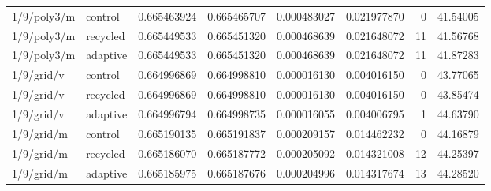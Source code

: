 \begin{longtable}{llrrrrrr}
1/9/poly3/m & control & 0.665463924 & 0.665465707 & 0.000483027 & 0.021977870 & 0 & 41.54005 \\
1/9/poly3/m & recycled & 0.665449533 & 0.665451320 & 0.000468639 & 0.021648072 & 11 & 41.56768 \\
1/9/poly3/m & adaptive & 0.665449533 & 0.665451320 & 0.000468639 & 0.021648072 & 11 & 41.87283 \\
1/9/grid/v & control & 0.664996869 & 0.664998810 & 0.000016130 & 0.004016150 & 0 & 43.77065 \\
1/9/grid/v & recycled & 0.664996869 & 0.664998810 & 0.000016130 & 0.004016150 & 0 & 43.85474 \\
1/9/grid/v & adaptive & 0.664996794 & 0.664998735 & 0.000016055 & 0.004006795 & 1 & 44.63790 \\
1/9/grid/m & control & 0.665190135 & 0.665191837 & 0.000209157 & 0.014462232 & 0 & 44.16879 \\
1/9/grid/m & recycled & 0.665186070 & 0.665187772 & 0.000205092 & 0.014321008 & 12 & 44.25397 \\
1/9/grid/m & adaptive & 0.665185975 & 0.665187676 & 0.000204996 & 0.014317674 & 13 & 44.28520 \\
\hline\end{longtable}
\endgroup
